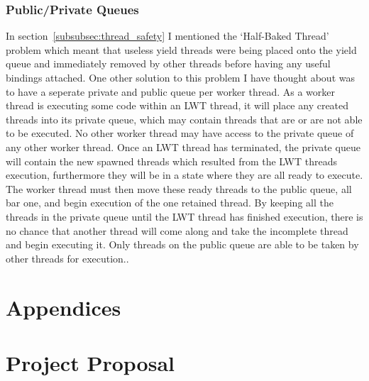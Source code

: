 \documentclass[12pt,twoside,notitlepage]{report}
\begin{document}
\subsection{Public/Private Queues}
In section~\ref{subsubsec:thread_safety} I mentioned the `Half-Baked Thread' problem which meant that useless yield threads were being placed onto the yield queue and immediately removed by other threads before having any useful
bindings attached. One other solution to this problem I have thought about was to have a seperate private and public queue per worker thread. As a worker thread is executing some code within an LWT thread, it will place any created
threads into its private queue, which may contain threads that are or are not able to be executed. No other worker thread may have access to the private queue of any other worker thread. Once an LWT thread has terminated, the private
queue will contain the new spawned threads which resulted from the LWT threads execution, furthermore they will be in a state where they are all ready to execute. The worker thread must then move these ready threads to the public
queue, all bar one, and begin execution of the one retained thread. By keeping all the threads in the private queue until the LWT thread has finished execution, there is no chance that another thread will come along and take the
incomplete thread and begin executing it. Only threads on the public queue are able to be taken by other threads for execution..



\chapter{Appendices}
\label{chap:appendices}

\chapter{Project Proposal}
\label{chap:proposal}

\end{document}
